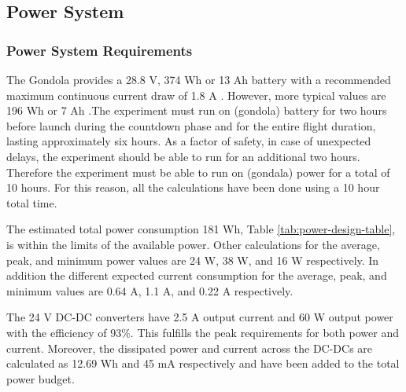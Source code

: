 \pagebreak
\subsection{Power System}

\subsubsection{Power System Requirements}
\begin{centering}
The Gondola provides a 28.8 V, 374 Wh or 13 Ah battery with a recommended maximum continuous current draw of 1.8 A . However, more typical values are 196 Wh or 7 Ah \cite{BexusManual}.The experiment must run on (gondola) battery for two hours before launch during the countdown phase and for the entire flight duration, lasting approximately six hours. As a factor of safety, in case of unexpected delays, the experiment should be able to run for an additional two hours. Therefore the experiment must be able to run on (gondala) power for a total of 10 hours. For this reason, all the calculations have been done using a 10 hour total time\cite{BexusManual}.
\end{centering}





The estimated total power consumption 181 Wh, Table \ref{tab:power-design-table}, is within the limits of the available power. Other calculations for the average, peak, and minimum power values are 24 W, 38 W, and 16 W respectively. In addition the different expected current consumption for the average, peak, and minimum values are 0.64 A, 1.1 A, and 0.22 A respectively.

The 24 V DC-DC converters have 2.5 A output current and 60 W output power with the efficiency of 93\%. This fulfills the peak requirements for both power and current. Moreover, the dissipated power and current across the DC-DCs are calculated as 12.69 Wh and 45 mA respectively and have been added to the total power budget. 



\raggedbottom
